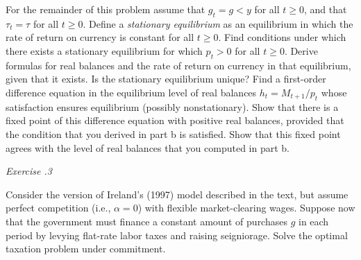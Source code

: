 \medskip
For the remainder of this problem assume that $g_t = g < y$ for
all $t \geq 0$, and that $\tau_t = \tau$ for all $t \geq 0$.
Define a {\it stationary equilibrium\/} as an equilibrium
in which the rate of return on currency is constant for all
$t \geq 0$.
\medskip
{}  Find conditions under which there exists
a  stationary equilibrium for which $p_t > 0$ for all
$t \geq 0$. Derive formulas for real balances and the
rate of return on currency in that equilibrium, given
that it exists.  Is the stationary equilibrium unique?
\medskip
{}  Find a first-order difference equation
in the equilibrium level of real balances $h_t = M_{t+1}/p_t$
whose satisfaction ensures equilibrium (possibly nonstationary).
\medskip
{}  Show that there is a fixed point of
this difference equation with positive real balances, provided
that the condition that you derived in part b is satisfied.
Show that this fixed point agrees with the level of real balances
that you computed in part b.
%
%
%

\medskip\noindent
{\it Exercise \the\chapternum.3} 


\medskip\noindent
Consider the version of Ireland's (1997) model described in the text,
but assume perfect competition (i.e., $\alpha=0$) with flexible
market-clearing wages.  Suppose now that the government must finance
a constant amount of purchases $g$ in each period by levying flat-rate
labor taxes and raising seigniorage. Solve the optimal taxation problem
under commitment.

\medskip


